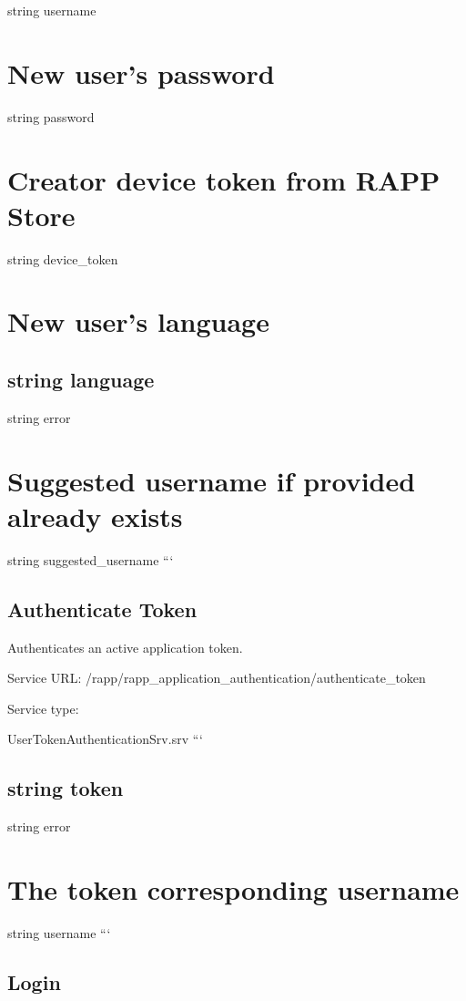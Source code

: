 string username \section*{New user's password}

string password \section*{Creator device token from R\-A\-P\-P Store}

string device\-\_\-token \section*{New user's language}

\subsection*{string language }

string error \section*{Suggested username if provided already exists}

string suggested\-\_\-username ```

\subsection*{Authenticate Token}

Authenticates an active application token.

Service U\-R\-L\-: {\ttfamily /rapp/rapp\-\_\-application\-\_\-authentication/authenticate\-\_\-token}

Service type\-:

User\-Token\-Authentication\-Srv.\-srv ``` \subsection*{string token }

string error \section*{The token corresponding username}

string username ```

\subsection*{Login}


